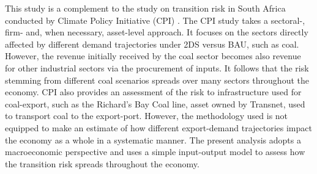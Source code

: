\documentclass[12pt,english]{article}
\begin{document}

This study is a complement to the study on transition risk in South Africa conducted by Climate Policy Initiative (CPI) .
The CPI study takes a sectoral-, firm- and, when necessary, asset-level approach. %
It focuses on the sectors directly affected by different demand trajectories under 2DS versus BAU, such as coal. However, the revenue initially received by the coal sector becomes also revenue for other industrial sectors via the procurement of inputs. It follows that the risk stemming from different coal scenarios spreads over many sectors throughout the economy. CPI also provides an assessment of the risk to infrastructure used for coal-export, such as the Richard's Bay Coal line, asset owned by Transnet, used to transport coal to the export-port. However, the methodology used is not equipped to make an estimate of how different export-demand trajectories impact the economy as a whole in a systematic manner. The present analysis adopts a macroeconomic perspective and uses a simple input-output model to assess how the transition risk spreads throughout the economy. %
\end{document}
